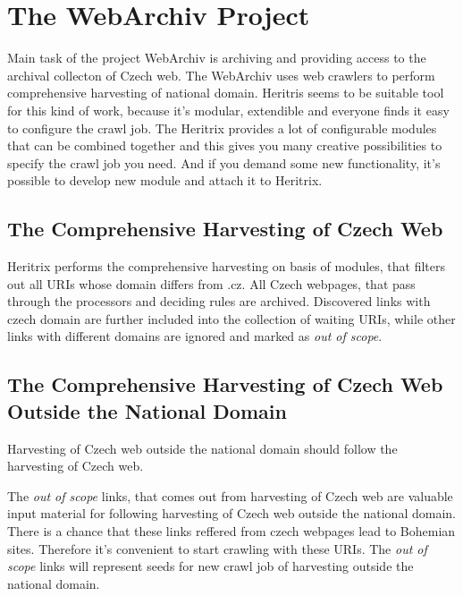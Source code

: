 \documentclass[11pt,a4paper]{article}
\begin{document}

\newpage
\section{The WebArchiv Project}

Main task of the project WebArchiv is archiving and providing access to the archival collecton of Czech web. The WebArchiv uses web crawlers to perform comprehensive harvesting of national domain. Heritris seems to be suitable tool for this kind of work, because it's modular, extendible and everyone finds it easy to configure the crawl job. The Heritrix provides a lot of configurable modules that can be combined together and this gives you many creative possibilities to specify the crawl job you need. And if you demand some new functionality, it's possible to develop new module and attach it to Heritrix.

\subsection*{The Comprehensive Harvesting of Czech Web}
Heritrix performs the comprehensive harvesting on basis of modules, that filters out all URIs whose domain differs from .cz. All Czech webpages, that pass through the processors and deciding rules are archived. Discovered links with czech domain are further included into the collection of waiting URIs, while other links with different domains are ignored and marked as \emph{out of scope}.

\subsection*{The Comprehensive Harvesting of Czech Web Outside the National Domain}
Harvesting of Czech web outside the national domain should follow the harvesting of Czech web. 

The \emph{out of scope} links, that comes out from harvesting of Czech web are valuable input material for following harvesting of Czech web outside the national domain. There is a chance that these links reffered from czech webpages lead to Bohemian sites. Therefore it's convenient to start crawling with these URIs. The \emph{out of scope} links will represent seeds for new crawl job of harvesting outside the national domain.

\end{document}
